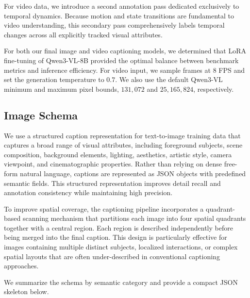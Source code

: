 \documentclass{llmxive}
\begin{document}
For video data, we introduce a second annotation pass dedicated exclusively to temporal dynamics. Because motion and state transitions are fundamental to video understanding, this secondary pass comprehensively labels temporal changes across all explicitly tracked visual attributes.

For both our final image and video captioning models, we determined that LoRA fine-tuning of \mbox{Qwen3-VL-8B} provided the optimal balance between benchmark metrics and inference efficiency. For video input, we sample frames at $8$ FPS and set the generation temperature to $0.7$. We also use the default \mbox{Qwen3-VL} minimum and maximum pixel bounds, $131,072$ and $25,165,824$, respectively.


\subsection{Image Schema}

We use a structured caption representation for text-to-image training data that captures a broad range of visual attributes, including foreground subjects, scene composition, background elements, lighting, aesthetics, artistic style, camera viewpoint, and cinematographic properties. Rather than relying on dense free-form natural language, captions are represented as JSON objects with predefined semantic fields. This structured representation improves detail recall and annotation consistency while maintaining high precision.

To improve spatial coverage, the captioning pipeline incorporates a quadrant-based scanning mechanism that partitions each image into four spatial quadrants together with a central region. Each region is described independently before being merged into the final caption. This design is particularly effective for images containing multiple distinct subjects, localized interactions, or complex spatial layouts that are often under-described in conventional captioning approaches.

We summarize the schema by semantic category and provide a compact JSON skeleton below.
\end{document}
